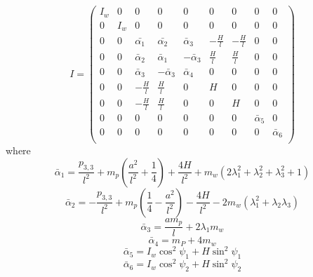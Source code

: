 \begin{equation}
    I=
    \left(
\begin{array}{ccccccccc}
I_w & 0 & 0 & 0 & 0 & 0 & 0 & 0 & 0 \\
 0 & I_w & 0 & 0 & 0 & 0 & 0 & 0 & 0 \\
 0 & 0 & \bar{\alpha_1} & \bar{\alpha_2} & \bar \alpha_3  & -\frac{H}{l} & -\frac{H}{l} & 0 & 0 \\
 0 & 0 & \bar \alpha_2 & \bar \alpha_1 & -\bar\alpha_3 & \frac{H}{l} & \frac{H}{l} & 0 & 0 \\
 0 & 0 & \bar\alpha_3 & -\bar\alpha_3 & \bar\alpha_4& 0 & 0 & 0 & 0 \\
 0 & 0 & -\frac{H}{l} & \frac{H}{l} & 0 & H & 0 & 0 & 0 \\
 0 & 0 & -\frac{H}{l} & \frac{H}{l} & 0 & 0 & H & 0 & 0 \\
 0 & 0 & 0 & 0 & 0 & 0 & 0 & \bar \alpha_5 & 0 \\
 0 & 0 & 0 & 0 & 0 & 0 & 0 & 0 & \bar \alpha_6 \\
\end{array}
\right)
\end{equation}
where
\begin{equation*}
    \bar\alpha_1=\frac{p_{3,3}}{l^2}+m_p \left(\frac{a^2}{l^2}+\frac{1}{4}\right)+\frac{4 H}{l^2}+m_w \left(2 \lambda_1^2+\lambda_2^2+\lambda_3 ^2+1\right)
\end{equation*}
\[\bar \alpha_2=
-\frac{p_{3,3}}{l^2}+m_p \left(\frac{1}{4}-\frac{a^2}{l^2}\right)-\frac{4 H}{l^2}-2 m_w(\lambda_1^2 + \lambda_2 \lambda_3 )
\]
\[\bar\alpha_3=
\frac{a m_p}{l}+2 \lambda_1 m_w \]
\[\bar\alpha_4= m_P+4 m_w \]
\[\bar\alpha_5= I_w \cos^2{\psi_1}+H \sin^2{\psi_1}\]
\[\bar\alpha_6= I_w \cos^2{\psi_2}+H \sin^2{\psi_2}\]

